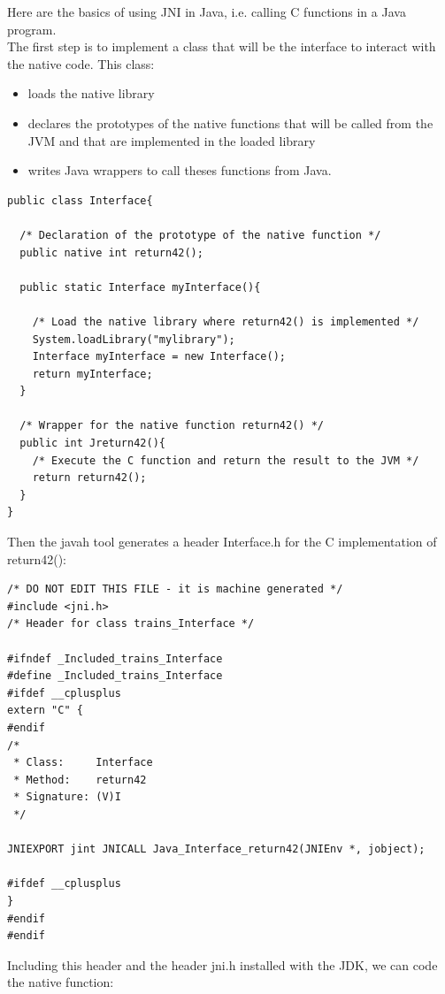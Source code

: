 \documentclass[a4paper,10pt]{report}
\begin{document}
Here are the basics of using JNI in Java, i.e. calling C functions in a Java program.\\

The first step is to implement a class that will be the interface to interact with the native code. This class:
\begin{itemize}
  \item loads the native library
  \item declares the prototypes of the native functions that will be called from the JVM and that are implemented in the loaded library
   \item writes Java wrappers to call theses functions from Java.\\
\end{itemize}

\lstset{language=java}
\lstset{commentstyle=\textit} 
\begin{lstlisting}
public class Interface{

  /* Declaration of the prototype of the native function */
  public native int return42();

  public static Interface myInterface(){

    /* Load the native library where return42() is implemented */
    System.loadLibrary("mylibrary");
    Interface myInterface = new Interface();
    return myInterface;
  }

  /* Wrapper for the native function return42() */
  public int Jreturn42(){
    /* Execute the C function and return the result to the JVM */
    return return42();
  }
}
\end{lstlisting}

Then the javah tool generates a header Interface.h for the C implementation of return42():\\
\lstset{language=C}
\lstset{commentstyle=\textit} 
\begin{lstlisting}
/* DO NOT EDIT THIS FILE - it is machine generated */
#include <jni.h>
/* Header for class trains_Interface */

#ifndef _Included_trains_Interface
#define _Included_trains_Interface
#ifdef __cplusplus
extern "C" {
#endif
/*
 * Class:     Interface
 * Method:    return42
 * Signature: (V)I
 */

JNIEXPORT jint JNICALL Java_Interface_return42(JNIEnv *, jobject);

#ifdef __cplusplus
}
#endif
#endif
\end{lstlisting}

Including this header and the header jni.h installed with the JDK, we can code the native function:\\
\end{document}
